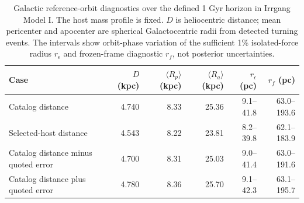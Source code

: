 \begin{table}[t]
\caption{Galactic reference-orbit diagnostics over the defined 1 Gyr horizon in Irrgang Model I. The host mass profile is fixed. $D$ is heliocentric distance; mean pericenter and apocenter are spherical Galactocentric radii from detected turning events. The intervals show orbit-phase variation of the sufficient 1\% isolated-force radius $r_\epsilon$ and frozen-frame diagnostic $r_f$, not posterior uncertainties.}\label{tab:galactic-orbit}
\centering\begin{tabular}{lrrrrr}
\toprule
Case & $D$ (kpc) & $\langle R_p\rangle$ (kpc) & $\langle R_a\rangle$ (kpc) & $r_\epsilon$ (pc) & $r_f$ (pc) \\
\midrule
Catalog distance & 4.740 & 8.33 & 25.36 & 9.1--41.8 & 63.0--193.6  \\
Selected-host distance & 4.543 & 8.22 & 23.81 & 8.2--39.8 & 62.1--183.9  \\
Catalog distance minus quoted error & 4.700 & 8.31 & 25.03 & 9.0--41.4 & 63.0--191.6  \\
Catalog distance plus quoted error & 4.780 & 8.36 & 25.70 & 9.1--42.3 & 63.1--195.7  \\
\bottomrule
\end{tabular}
\end{table}
